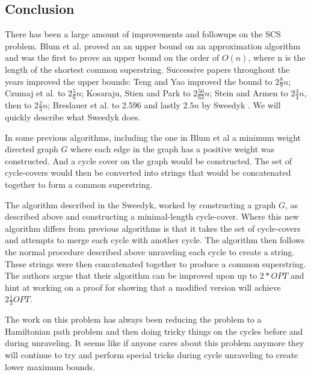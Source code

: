 \documentclass[letterpaper,11pt,titlepage]{article}
\begin{document}
\subsection{Conclusion}
There has been a large amount of improvements and followups on the SCS problem. Blum et al. proved an an upper bound on an approximation algorithm and was the first to prove an upper bound on the order of $O(n)$, where n is the length of the shortest common superstring. Successive papers throughout the years improved the upper bounds: Teng and Yao improved the bound to $2 \frac{8}{9} n$; Czumaj et al. to $2 \frac{5}{6} n$; Kosaraju, Stien and Park to $2 \frac{50}{63} n$; Stein and Armen to $2 \frac{3}{4} n$, then to $2 \frac{2}{3} n$; Breslauer et al. to 2.596 and lastly $2.5 n$ by Sweedyk \cite{sweedyk2000boldmath}. We will quickly describe what Sweedyk does.

In some previous algorithms, including the one in Blum et al a minimum weight directed graph $G$ where each edge in the graph has a positive weight was constructed. And a cycle cover on the graph would be constructed. The set of cycle-covers would then be converted into strings that would be concatenated together to form a common superstring.

The algorithm described in the Sweedyk, worked by constructing a graph $G$, as described above and constructing a minimal-length cycle-cover. Where this new algorithm differs from previous algorithms is that it takes the set of cycle-covers and attempts to merge each cycle with another cycle. 
The algorithm then follows the normal procedure described above unraveling each cycle to create a string. These strings were then concatenated together to produce a common superstring. The authors argue that their algorithm can be improved upon up to $2 * OPT$ and hint at working on a proof for showing that a modified version will achieve $2\frac{1}{3} OPT$.

The work on this problem has always been reducing the problem to a Hamiltonian path problem and then doing tricky things on the cycles before and during unraveling. It seems like if anyone cares about this problem anymore they will continue to try and perform special tricks during cycle unraveling to create lower maximum bounds.

\newpage

{
  \small 
  
  
}
\end{document}
